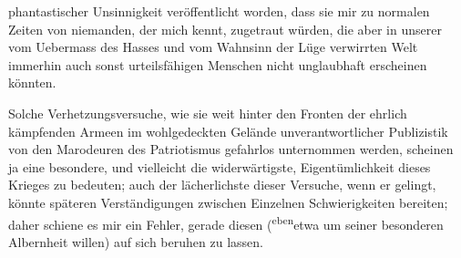                phantastischer Unsinnigkeit veröffentlicht worden, dass sie mir zu normalen Zeiten
               von niemanden, der mich kennt, zugetraut würden, die aber in unserer vom Uebermass
               des Hasses und vom Wahnsinn der Lüge verwirrten Welt immerhin auch sonst
               urteilsfähigen Menschen nicht unglaubhaft erscheinen könnten.\pend
           
\pstart
           Solche Verhetzungsversuche, wie sie weit hinter den Fronten der ehrlich kämpfenden
               Armeen im wohlgedeckten Gelände unverantwortlicher Publizistik von den Marodeuren des
               Patriotismus gefahrlos unternommen werden, scheinen ja eine besondere, und vielleicht
               die widerwärtigste, Eigentümlichkeit dieses Krieges zu bedeuten; auch der
               lächerlichste dieser Ver{\pb}suche, wenn er gelingt, könnte
               späteren Verständigungen zwischen Einzelnen Schwierigkeiten bereiten; daher schiene
               es mir ein Fehler, gerade diesen (\substVorne{}\textsuperscript{eben}\substDazwischen{}etwa\substHinten{} um seiner besonderen Albernheit willen) auf sich beruhen zu lassen.\pend
           
